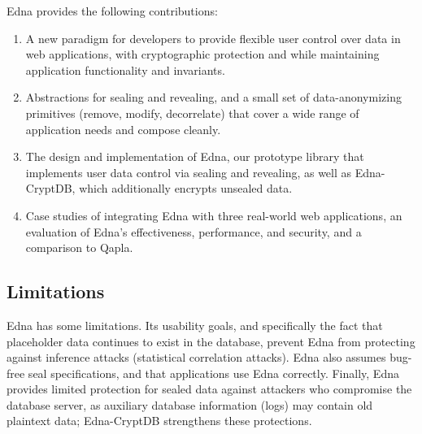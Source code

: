\label{sec:intro:contrib}
Edna provides the following contributions:
\begin{enumerate}[nosep] 
    \item A new paradigm for developers to provide flexible user control over data in web applications, with cryptographic protection and while maintaining application functionality and invariants.
    \item Abstractions for sealing and revealing, and a small set of data-anonymizing primitives (remove, modify, decorrelate) that cover a wide range of application needs and compose cleanly.
    \item The design and implementation of Edna, our prototype library that implements user data control via sealing and revealing, as well as Edna-CryptDB, which additionally encrypts unsealed data.
    \item Case studies of integrating Edna with three real-world web applications, an evaluation of Edna's effectiveness, performance, and security, and a comparison to Qapla.
\end{enumerate}

\begin{comment}
\subsection{Design}
We combine Edna with an encrypted database to achieve stronger guarantees.
Edna-CryptDB simultaneously protects against database server compromises even for
unsealed data and adds Edna's protections for sealed data to encrypted
databases, which have no built-in support for removing sensitive data without
breaking the application.

\subsection{Evaluation}
To investigate the need for Edna as a new system, we tried to realize Edna's
functionality atop Qapla~\cite{qapla}, a framework that rewrites SQL queries to
conform to access control policies. We found that Qapla requires invasive
application changes, its abstractions are awkward for sealing and revealing, and
Qapla's query rewriting slows down common queries.
\end{comment}

\subsection{Limitations}
Edna has some limitations. Its usability goals, and specifically the fact that
placeholder data continues to exist in the database, prevent Edna from
protecting against inference attacks (\eg statistical correlation attacks). Edna
also assumes bug-free seal specifications, and that applications use
Edna correctly. Finally, Edna provides limited protection for sealed data
against attackers who compromise the database server, as auxiliary database
information (\eg logs) may contain old plaintext data; Edna-CryptDB strengthens
these protections.

